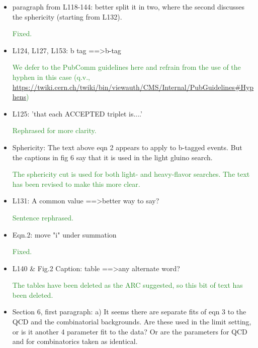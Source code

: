 \documentclass[paper=a4, fontsize=11pt]{scrartcl}
\begin{document}
\begin{itemize}
\item paragraph from L118-144: 
better split it in two, where the second discusses the sphericity (starting 
from L132). 

\textcolor{ForestGreen}{Fixed.}\\

\item L124, L127, L153: 
b tag ==\textgreater b-tag 

\textcolor{ForestGreen}{We defer to the PubComm guidelines here and refrain from the use of the hyphen
in this case (q.v., \url{https://twiki.cern.ch/twiki/bin/viewauth/CMS/Internal/PubGuidelines\#Hyphens})}\\


\item L125: 'that each ACCEPTED triplet is....' 

\textcolor{ForestGreen}{Rephrased for more clarity.}\\

\item Sphericity: 
The text above eqn 2 appears to apply to b-tagged events. But the captions 
in fig 6 say that it is used in the light gluino search. 

\textcolor{ForestGreen}{The sphericity cut is used for both light- and heavy-flavor searches.
The text has been revised to make this more clear.}\\

\item L131: 
A common value ==\textgreater better way to say? 

\textcolor{ForestGreen}{Sentence rephrased.}\\

\item Eqn.2: 
move "i" under summation 

\textcolor{ForestGreen}{Fixed.}\\

\item L140 \& Fig.2 Caption: 
table ==\textgreater any alternate word? 

\textcolor{ForestGreen}{The tables have been deleted as the ARC suggested, so this bit
of text has been deleted.}\\

\item Section 6, first paragraph: 
a) It seems there are separate fits of eqn 3 to the QCD and the combinatorial 
backgrounds. Are these used in the limit setting, or is it another 4 
parameter fit to the data? Or are the parameters for QCD and for 
combinatorics taken as identical. 


\end{itemize}
\end{document}
